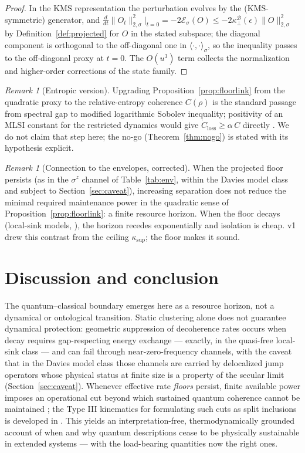 \documentclass[11pt,a4paper]{article}
\theoremstyle{plain}
\theoremstyle{definition}
\theoremstyle{remark}
\newtheorem{remark}[theorem]{Remark}
\newcommand{\eps}{\epsilon}
\newcommand{\ksup}{\kappa_{\sup}}
\newcommand{\kfl}{\kappa_{\perp}}
\begin{document}
\begin{proof}
In the KMS representation the perturbation evolves by the (KMS-symmetric)
generator, and $\frac{d}{dt}\|O_t\|^2_{2,\sigma}\big|_{t=0} =
-2\mathcal{E}_\sigma(O) \le -2\kfl^{\mathcal{B}}(\eps)\|O\|^2_{2,\sigma}$ by
Definition~\ref{def:projected} for $O$ in the stated subspace; the diagonal
component is orthogonal to the off-diagonal one in
$\langle\cdot,\cdot\rangle_\sigma$, so the inequality passes to the
off-diagonal proxy at $t = 0$. The $O(u^3)$ term collects the normalization
and higher-order corrections of the state family.
\end{proof}

\begin{remark}[Entropic version]
Upgrading Proposition~\ref{prop:floorlink} from the quadratic proxy to the
relative-entropy coherence $C(\rho)$ is the standard passage from spectral
gap to modified logarithmic Sobolev inequality; positivity of an MLSI
constant for the restricted dynamics would give
$\dot{C}_{\mathrm{loss}} \ge \alpha\, C$ directly
\cite{KastoryanoTemme2013}. We do not claim that step here; the no-go
(Theorem~\ref{thm:nogo}) is stated with its hypothesis explicit.
\end{remark}

\begin{remark}[Connection to the envelopes, corrected]
When the projected floor persists (as in the $\sigma^z$ channel of
Table~\ref{tab:env}, within the Davies model class and subject to
Section~\ref{sec:caveat}), increasing separation does not reduce the minimal
required maintenance power in the quadratic sense of
Proposition~\ref{prop:floorlink}: a finite resource horizon. When the floor
decays (local-sink models, \cite{HCut}), the horizon recedes exponentially
and isolation is cheap. v1 drew this contrast from the ceiling $\ksup$; the
floor makes it sound.
\end{remark}

\section{Discussion and conclusion}

The quantum--classical boundary emerges here as a resource horizon, not a
dynamical or ontological transition. Static clustering alone does not
guarantee dynamical protection: geometric suppression of decoherence rates
occurs when decay requires gap-respecting energy exchange --- exactly, in the
quasi-free local-sink class \cite{HCut} --- and can fail through
near-zero-frequency channels, with the caveat that in the Davies model class
those channels are carried by delocalized jump operators whose physical
status at finite size is a property of the secular limit
(Section~\ref{sec:caveat}). Whenever effective rate \emph{floors} persist,
finite available power imposes an operational cut beyond which sustained
quantum coherence cannot be maintained \cite{MaintWork}; the Type III
kinematics for formulating such cuts as split inclusions is developed in
\cite{Clustering}. This yields an interpretation-free, thermodynamically
grounded account of when and why quantum descriptions cease to be physically
sustainable in extended systems --- with the load-bearing quantities now the
right ones.
\end{document}
